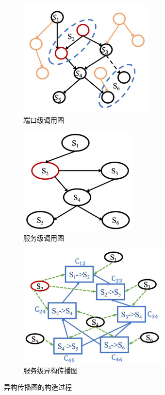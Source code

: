 \begin{figure}[ht]
    \centering
    \begin{subfigure}{0.32\linewidth}
        \centering
        \includegraphics[scale = 0.6]{img/port-level call graph.png}
        \caption{端口级调用图}
        \label{img:Port-level call graph}
    \end{subfigure}
    \begin{subfigure}{0.32\linewidth}
        \centering
        \includegraphics[scale = 0.6]{img/Service-level call graph.png}
        \caption{服务级调用图}
        \label{img:Service-level call graph}
    \end{subfigure}
    \begin{subfigure}{0.32\linewidth}
        \centering
        \includegraphics[scale = 0.55]{img/Service-level Heterogeneous Propagation Graph.png}
        \caption{服务级异构传播图}
        \label{img:Service-level Heterogeneous Propagation Graph}
    \end{subfigure}
    \caption{异构传播图的构造过程}
\end{figure}
